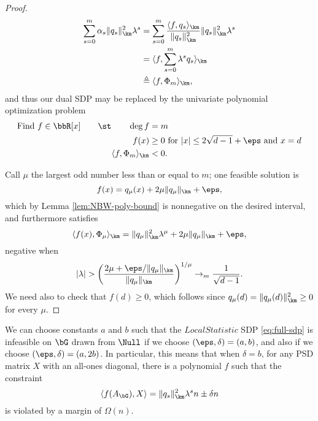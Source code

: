 \begin{proof}
\begin{align*}
	\sum_{s=0}^m \alpha_s \|q_s\|^2_{\km}\lambda^s
	&= \sum_{s=0}^m \frac{\langle f,q_s \rangle_\km}{\|q_s\|^2_\km}\|q_s\|^2_{\km}\lambda^s \\
	&= \langle f, \sum_{s=0}^m \lambda^s q_s \rangle_\km \\
	&\triangleq \langle f, \Phi_m \rangle_\km,
\end{align*}
and thus our dual SDP may be replaced by the univariate polynomial optimization problem
\begin{align}
    \text{Find } f \in \bbR[x] \qquad \st \qquad \deg f &= m \\
    f(x) &\ge 0 \text{ for $|x| \le 2\sqrt{d-1} + \eps$ and $x = d$} \nonumber \\
    \langle f,\Phi_m \rangle_{\km} &< 0. \nonumber
\end{align}

Call $\mu$ the largest odd number less than or equal to $m$; one feasible solution is
$$
    f(x) = q_\mu(x) + 2\mu\|q_{\mu}\|_{\km} + \eps,
$$
which by Lemma \ref{lem:NBW-poly-bound} is nonnegative on the desired interval, and furthermore satisfies
$$ 
    \langle f(x), \Phi_\mu \rangle_{\km} = \|q_\mu\|^2_{\km}\lambda^\mu + 2\mu\|q_\mu\|_{\km} + \eps,
$$
negative when
$$ 
    |\lambda| > \left(\frac{2\mu + \eps/\|q_\mu\|_{\km}}{\|q_{\mu}\|_{\km}}\right)^{1/\mu} \to_m \frac{1}{\sqrt{d-1}}.
$$
We need also to check that $f(d) \ge 0$, which follows since $q_\mu(d) = \|q_\mu(d)\|^2_{\km} \ge 0$ for every $\mu$.
\end{proof}


\begin{remark}  \label{rem:violation-margin}
    We can choose constants $a$ and $b$ such that the $LocalStatistic$ SDP \eqref{eq:full-sdp} is infeasible on $\bG$ drawn from $\Null$ if we choose $(\eps, \delta) = (a, b)$, and also if we choose $(\eps, \delta) = (a, 2b)$.  In particular, this means that when $\delta = b$, for any PSD matrix $X$ with an all-ones diagonal, there is a polynomial $f$ such that the constraint
    \[
        \langle f(A_{\bG}), X\rangle = \|q_s\|^2_{\km}\lambda^s n \pm \delta n
    \]
    is violated by a margin of $\Omega(n)$.
\end{remark}


